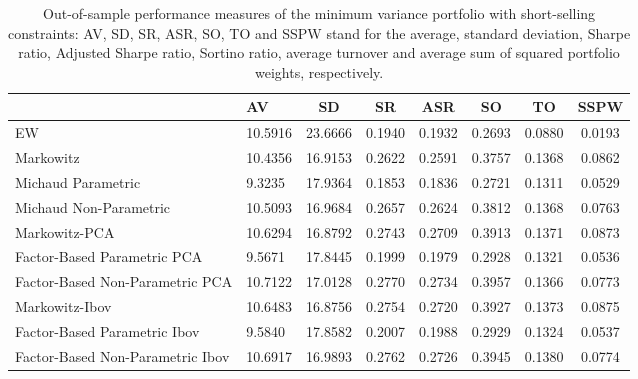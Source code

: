 \begin{table}

\caption{\label{tab:empirical_mvp}Out-of-sample performance measures of the minimum variance portfolio with short-selling constraints: AV, SD, SR, ASR, SO, TO and SSPW stand for the average, standard deviation, Sharpe ratio, Adjusted Sharpe ratio, Sortino ratio, average turnover and average sum of squared portfolio weights, respectively.}
\centering
\begin{tabular}[t]{l|l|c|c|c|c|c|c}
\hline
  & AV & SD & SR & ASR & SO & TO & SSPW\\
\hline
EW & 10.5916 & 23.6666 & 0.1940 & 0.1932 & 0.2693 & 0.0880 & 0.0193\\
\hline
Markowitz & 10.4356 & 16.9153 & 0.2622 & 0.2591 & 0.3757 & 0.1368 & 0.0862\\
\hline
Michaud Parametric & 9.3235 & 17.9364 & 0.1853 & 0.1836 & 0.2721 & 0.1311 & 0.0529\\
\hline
Michaud Non-Parametric & 10.5093 & 16.9684 & 0.2657 & 0.2624 & 0.3812 & 0.1368 & 0.0763\\
\hline
Markowitz-PCA & 10.6294 & 16.8792 & 0.2743 & 0.2709 & 0.3913 & 0.1371 & 0.0873\\
\hline
Factor-Based Parametric PCA & 9.5671 & 17.8445 & 0.1999 & 0.1979 & 0.2928 & 0.1321 & 0.0536\\
\hline
Factor-Based Non-Parametric PCA & 10.7122 & 17.0128 & 0.2770 & 0.2734 & 0.3957 & 0.1366 & 0.0773\\
\hline
Markowitz-Ibov & 10.6483 & 16.8756 & 0.2754 & 0.2720 & 0.3927 & 0.1373 & 0.0875\\
\hline
Factor-Based Parametric Ibov & 9.5840 & 17.8582 & 0.2007 & 0.1988 & 0.2929 & 0.1324 & 0.0537\\
\hline
Factor-Based Non-Parametric Ibov & 10.6917 & 16.9893 & 0.2762 & 0.2726 & 0.3945 & 0.1380 & 0.0774\\
\hline
\end{tabular}
\end{table}
